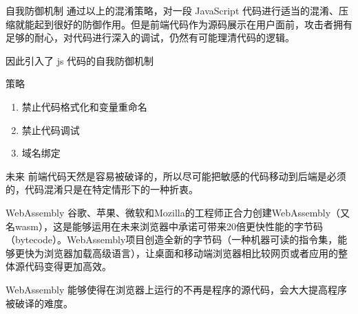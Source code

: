 \documentclass[presentation]{beamer}
\begin{document}
\begin{frame}[label=sec-11]{自我防御机制}
通过以上的混淆策略，对一段 JavaScript 代码进行适当的混淆、压缩就能起到很好的防御作用。但是前端代码作为源码展示在用户面前，攻击者拥有足够的耐心，对代码进行深入的调试，仍然有可能理清代码的逻辑。

因此引入了 js 代码的自我防御机制
\begin{block}{策略}
\begin{enumerate}
\item 禁止代码格式化和变量重命名
\item 禁止代码调试
\item 域名绑定
\end{enumerate}
\end{block}
\end{frame}
\begin{frame}[label=sec-12]{未来}
前端代码天然是容易被破译的，所以尽可能把敏感的代码移动到后端是必须的，代码混淆只是在特定情形下的一种折衷。
\begin{block}{WebAssembly}
谷歌、苹果、微软和Mozilla的工程师正合力创建WebAssembly（又名wasm），这是能够运用在未来浏览器中承诺可带来20倍更快性能的字节码（bytecode）。WebAssembly项目创造全新的字节码（一种机器可读的指令集，能够更快为浏览器加载高级语言），让桌面和移动端浏览器相比较网页或者应用的整体源代码变得更加高效。

WebAssembly 能够使得在浏览器上运行的不再是程序的源代码，会大大提高程序被破译的难度。
\end{block}
\end{frame}
\end{document}
